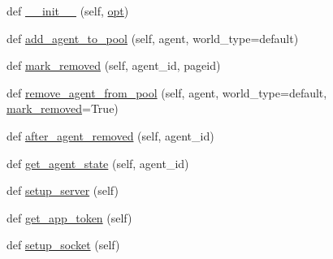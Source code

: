 \begin{DoxyCompactItemize}
\item 
def \hyperlink{classparlai_1_1chat__service_1_1services_1_1messenger_1_1messenger__manager_1_1MessengerManager_a7a9b4068fc428aebd90c38bbe745e45e}{\+\_\+\+\_\+init\+\_\+\+\_\+} (self, \hyperlink{classparlai_1_1chat__service_1_1services_1_1messenger_1_1messenger__manager_1_1MessengerManager_a3800447e24df6857bcbdbddf068a8001}{opt})
\item 
def \hyperlink{classparlai_1_1chat__service_1_1services_1_1messenger_1_1messenger__manager_1_1MessengerManager_ad67c90bbf632d7bd4e6c6109c89d7c14}{add\+\_\+agent\+\_\+to\+\_\+pool} (self, agent, world\+\_\+type=\textquotesingle{}default\textquotesingle{})
\item 
def \hyperlink{classparlai_1_1chat__service_1_1services_1_1messenger_1_1messenger__manager_1_1MessengerManager_a305c58cba4b22f99274b81a9253a4ca9}{mark\+\_\+removed} (self, agent\+\_\+id, pageid)
\item 
def \hyperlink{classparlai_1_1chat__service_1_1services_1_1messenger_1_1messenger__manager_1_1MessengerManager_ad896b8db2d47d53b82ab052613e58845}{remove\+\_\+agent\+\_\+from\+\_\+pool} (self, agent, world\+\_\+type=\textquotesingle{}default\textquotesingle{}, \hyperlink{classparlai_1_1chat__service_1_1services_1_1messenger_1_1messenger__manager_1_1MessengerManager_a305c58cba4b22f99274b81a9253a4ca9}{mark\+\_\+removed}=True)
\item 
def \hyperlink{classparlai_1_1chat__service_1_1services_1_1messenger_1_1messenger__manager_1_1MessengerManager_ade5e639c76e2c48815c079d515ecaf9b}{after\+\_\+agent\+\_\+removed} (self, agent\+\_\+id)
\item 
def \hyperlink{classparlai_1_1chat__service_1_1services_1_1messenger_1_1messenger__manager_1_1MessengerManager_a53e1895f0a4ce74663bddb8f6c840aa7}{get\+\_\+agent\+\_\+state} (self, agent\+\_\+id)
\item 
def \hyperlink{classparlai_1_1chat__service_1_1services_1_1messenger_1_1messenger__manager_1_1MessengerManager_adb6559f9e8cca74e2ac94d443f36f9d2}{setup\+\_\+server} (self)
\item 
def \hyperlink{classparlai_1_1chat__service_1_1services_1_1messenger_1_1messenger__manager_1_1MessengerManager_a0fa4fe590efa528624a0965dbb995683}{get\+\_\+app\+\_\+token} (self)
\item 
def \hyperlink{classparlai_1_1chat__service_1_1services_1_1messenger_1_1messenger__manager_1_1MessengerManager_aa3762b7362346cdaaf1d1ad0d6372166}{setup\+\_\+socket} (self)

\end{DoxyCompactItemize}
